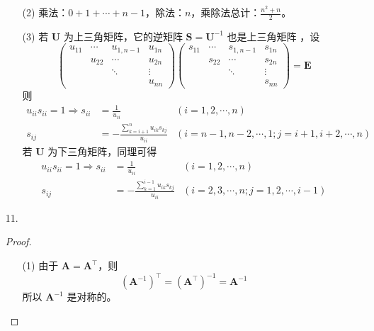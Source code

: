 \documentclass{sjtuarticle}
\begin{document}
\begin{itemize}
\begin{solution}
\begin{itemize}
            \item[(2)] 乘法：$0+1+\cdots+n-1$，除法：$n$，乘除法总计：$\frac{n^2+n}{2}$。
            \item[(3)] 若 $\bm{U}$ 为上三角矩阵，它的逆矩阵 $\bm{S}=\bm{U}^{-1}$ 也是上三角矩阵 %
            ，设
            \begin{equation*}
                \begin{pmatrix}
                    u_{11} & \cdots & u_{1,n-1} & u_{1n} \\
                      & u_{22} & \cdots & u_{2n} \\
                      &   &  \ddots & \vdots \\
                      &   &         & u_{nn}
                \end{pmatrix}
                \begin{pmatrix}
                    s_{11} & \cdots & s_{1,n-1} & s_{1n} \\
                      & s_{22} & \cdots & s_{2n} \\
                      &   &  \ddots & \vdots \\
                      &   &         & s_{nn}
                \end{pmatrix}=\bm{E}
            \end{equation*}
            则
            \begin{align*}
                u_{ii}s_{ii}=1 \Rightarrow s_{ii}&=\frac{1}{u_{ii}} & (i=1,2,\cdots,n) \\
                s_{ij}&=-\frac{\sum_{k=i+1}^n u_{ik}s_{kj}}{u_{ii}} & (i=n-1,n-2,\cdots,1;j=i+1,i+2,\cdots,n)
            \end{align*}
            若 $\bm{U}$ 为下三角矩阵，同理可得
            \begin{align*}
                u_{ii}s_{ii}=1 \Rightarrow s_{ii}&=\frac{1}{u_{ii}} & (i=1,2,\cdots,n) \\
                s_{ij}&=-\frac{\sum_{k=1}^{i-1} u_{ik}s_{kj}}{u_{ii}} & (i=2,3,\cdots,n;j=1,2,\cdots,i-1)
            \end{align*}
        \end{itemize}
    \end{solution}
    \item[11.] \begin{proof}
        \begin{itemize}
            \item[(1)] 
            由于 $\bm{A}=\bm{A}^\top$，则
            \begin{equation*}
                (\bm{A}^{-1})^\top = (\bm{A}^\top)^{-1} = \bm{A}^{-1}
            \end{equation*}
            所以 $\bm{A}^{-1}$ 是对称的。


\end{itemize}
\end{proof}
\end{itemize}
\end{document}
